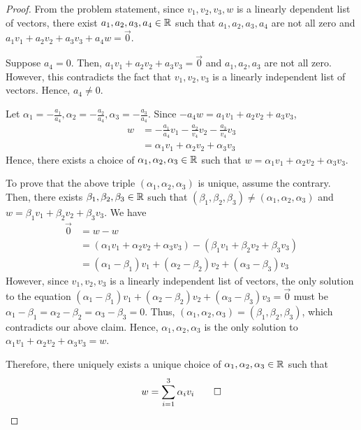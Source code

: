 \begin{proof}
    From the problem statement, since $v_1,v_2,v_3,w$ is a linearly dependent list of vectors, there exist $a_1,a_2,a_3,a_4\in\mathbb R$ such that $a_1,a_2,a_3,a_4$ are not all zero and $a_1v_1+a_2v_2+a_3v_3+a_4w=\vec{0}$.

    Suppose $a_4=0$. Then, $a_1v_1+a_2v_2+a_3v_3=\vec{0}$ and $a_1,a_2,a_3$ are not all zero. However, this contradicts the fact that $v_1,v_2,v_3$ is a linearly independent list of vectors. Hence, $a_4\not=0$.

    Let $\alpha_1=-\frac{a_1}{a_4},\alpha_2=-\frac{a_2}{a_4},\alpha_3=-\frac{a_3}{a_4}$. Since $-a_4w=a_1v_1+a_2v_2+a_3v_3$,
    \[
        \begin{aligned}
            w & = -\frac{a_1}{a_4}v_1-\frac{a_2}{v_4}v_2-\frac{a_3}{v_4}v_3 \\
              & = \alpha_1v_1+\alpha_2v_2+\alpha_3v_3
        \end{aligned}
    \]
    Hence, there exists a choice of $\alpha_1,\alpha_2,\alpha_3\in\mathbb R$ such that $w=\alpha_1v_1+\alpha_2v_2+\alpha_3v_3$.

    To prove that the above triple $(\alpha_1,\alpha_2,\alpha_3)$ is unique, assume the contrary. Then, there exists $\beta_1,\beta_2,\beta_3\in\mathbb R$ such that $(\beta_1,\beta_2,\beta_3)\not=(\alpha_1,\alpha_2,\alpha_3)$ and $w=\beta_1v_1+\beta_2v_2+\beta_3v_3$. We have
    \[
        \begin{aligned}
            \vec{0} & = w-w                                                                      \\
                    & = (\alpha_1v_1+\alpha_2v_2+\alpha_3v_3)-(\beta_1v_1+\beta_2v_2+\beta_3v_3) \\
                    & = (\alpha_1-\beta_1)v_1+(\alpha_2-\beta_2)v_2+(\alpha_3-\beta_3)v_3
        \end{aligned}
    \]
    However, since $v_1,v_2,v_3$ is a linearly independent list of vectors, the only solution to the equation $(\alpha_1-\beta_1)v_1+(\alpha_2-\beta_2)v_2+(\alpha_3-\beta_3)v_3=\vec{0}$ must be $\alpha_1-\beta_1=\alpha_2-\beta_2=\alpha_3-\beta_3=0$. Thus, $(\alpha_1,\alpha_2,\alpha_3)=(\beta_1,\beta_2,\beta_3)$, which contradicts our above claim. Hence, $\alpha_1,\alpha_2,\alpha_3$ is the only solution to $\alpha_1v_1+\alpha_2v_2+\alpha_3v_3=w$.

    Therefore, there uniquely exists a unique choice of $\alpha_1,\alpha_2,\alpha_3\in\mathbb R$ such that 
    \renewcommand{\qedsymbol}{$\blacksquare$}
    \[
        w=\sum_{i=1}^{3}\alpha_iv_i\qed
    \]
    \renewcommand{\qedsymbol}{}
\end{proof}